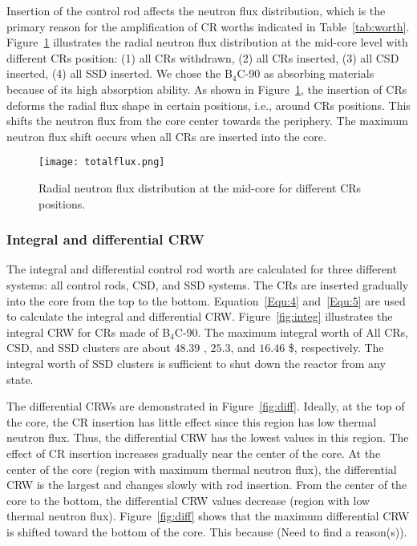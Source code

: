 Insertion of the control rod affects the neutron flux distribution, which is 
the primary reason for the amplification of CR worths indicated in 
Table~\ref{tab:worth}. Figure~\ref{fig:totalflux} illustrates the radial 
neutron flux distribution at the mid-core level with different CRs position: 
(1) all CRs withdrawn, (2) all CRs inserted, (3) all CSD inserted, (4) all SSD 
inserted. We chose the B$_4$C-90 as absorbing materials because of its high 
absorption ability. As shown in Figure~\ref{fig:totalflux}, the insertion of 
CRs deforms the radial flux shape in certain positions, i.e., around CRs 
positions. This shifts the neutron flux from the core center towards the 
periphery. The maximum neutron flux shift occurs when all CRs are inserted 
into the core.
\begin{figure}[!ht]
	\centering
	\texttt{[image: totalflux.png]}
	\vspace{-0.5in}
	\caption{Radial neutron flux distribution at the mid-core for different 
	CRs positions.} 
	\label{fig:totalflux}
\end{figure}
 

\subsubsection{Integral and differential CRW}

The integral and differential control rod worth are calculated for three 
different systems: all control rods, CSD, and SSD systems. The CRs are 
inserted gradually into the core from the top to the bottom. 
Equation~\ref{Equ:4} and~\ref{Equ:5} are used to calculate the integral and 
differential CRW. Figure~\ref{fig:integ} illustrates the integral CRW for CRs 
made of B$_4$C-90. The maximum integral worth of All CRs, CSD, and SSD 
clusters are about $48.39$ , $25.3$, and $16.46$ \$, respectively. The 
integral worth of SSD clusters is sufficient to shut down the reactor from any 
state.

The differential CRWs are demonstrated in Figure~\ref{fig:diff}. Ideally, at the top of the core, the CR insertion has little effect since this region has low thermal neutron flux. Thus, the differential CRW has the lowest values in this region. The effect of CR insertion increases gradually near the center of the core. At the center of the core (region with maximum thermal neutron flux), the differential CRW is the largest and changes slowly with rod insertion. From the center of the core to the bottom, the differential CRW values decrease (region with low thermal neutron flux). Figure~\ref{fig:diff} shows that the maximum differential CRW  is shifted toward the bottom of the core. This because (Need to find a reason(s)).

